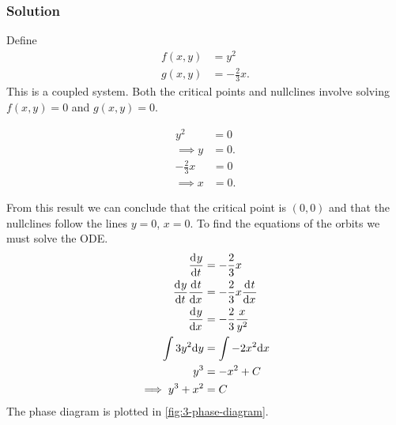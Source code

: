 \documentclass[12pt]{article}
\begin{document}
\subsubsection*{Solution}
Define
\begin{equation}
  \begin{aligned}
    f(x,y) &= y^2 \\
    g(x,y) &= -\frac{2}{3}x.
  \end{aligned}
\end{equation}
This is a coupled system. Both the critical points and nullclines involve
solving $f(x,y)=0$ and $g(x,y)=0$.
\begin{multicols}{2}
  \begin{equation*}
    \begin{aligned}
      y^2 &= 0 \\
      \implies y &= 0.
    \end{aligned}
  \end{equation*}
  \begin{equation*}
    \begin{aligned}
      -\frac{2}{3}x &= 0 \\
      \implies x &= 0.
    \end{aligned}
  \end{equation*}
\end{multicols} \noindent
From this result we can conclude that the critical point is $(0,0)$ and that the
nullclines follow the lines $y=0$, $x=0$. To find the equations of the orbits we
must solve the ODE.
\begin{equation}
  \begin{aligned}
    \frac{\mathrm{d}^{} {y}}{\mathrm{d}{t}^{}} &= -\frac{2}{3}x \\
    \frac{\mathrm{d}^{} {y}}{\mathrm{d}{t}^{}} \frac{\mathrm{d}^{} {t}}{\mathrm{d}{x}^{}} &= -\frac{2}{3}x \frac{\mathrm{d}^{} {t}}{\mathrm{d}{x}^{}} \\
    \frac{\mathrm{d}^{} {y}}{\mathrm{d}{x}^{}} &= -\frac{2}{3}\frac{x}{y^2} \\
    \int 3y^2 \mathrm{d}{y} &= \int -2x^2 \mathrm{d}{x} \\
    y^3 &= -x^2 + C \\
    \implies y^3 + x^2 &= C
  \end{aligned}
\end{equation}
The phase diagram is plotted in \cref{fig:3-phase-diagram}.

\end{document}
